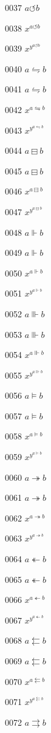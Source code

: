 \documentclass{article}
\begin{document}
0037 $\displaystyle a\circlearrowleft b$\par
0038 $x^{a\circlearrowleft b}$\par
0039 $x^{y^{a\circlearrowleft b}}$\par
0040 $a\leftrightharpoons b$\par
0041 $\displaystyle a\leftrightharpoons b$\par
0042 $x^{a\leftrightharpoons b}$\par
0043 $x^{y^{a\leftrightharpoons b}}$\par
0044 $a\boxminus b$\par
0045 $\displaystyle a\boxminus b$\par
0046 $x^{a\boxminus b}$\par
0047 $x^{y^{a\boxminus b}}$\par
0048 $a\Vdash b$\par
0049 $\displaystyle a\Vdash b$\par
0050 $x^{a\Vdash b}$\par
0051 $x^{y^{a\Vdash b}}$\par
0052 $a\Vvdash b$\par
0053 $\displaystyle a\Vvdash b$\par
0054 $x^{a\Vvdash b}$\par
0055 $x^{y^{a\Vvdash b}}$\par
0056 $a\vDash b$\par
0057 $\displaystyle a\vDash b$\par
0058 $x^{a\vDash b}$\par
0059 $x^{y^{a\vDash b}}$\par
0060 $a\twoheadrightarrow b$\par
0061 $\displaystyle a\twoheadrightarrow b$\par
0062 $x^{a\twoheadrightarrow b}$\par
0063 $x^{y^{a\twoheadrightarrow b}}$\par
0064 $a\twoheadleftarrow b$\par
0065 $\displaystyle a\twoheadleftarrow b$\par
0066 $x^{a\twoheadleftarrow b}$\par
0067 $x^{y^{a\twoheadleftarrow b}}$\par
0068 $a\leftleftarrows b$\par
0069 $\displaystyle a\leftleftarrows b$\par
0070 $x^{a\leftleftarrows b}$\par
0071 $x^{y^{a\leftleftarrows b}}$\par
0072 $a\rightrightarrows b$\par
\end{document}
